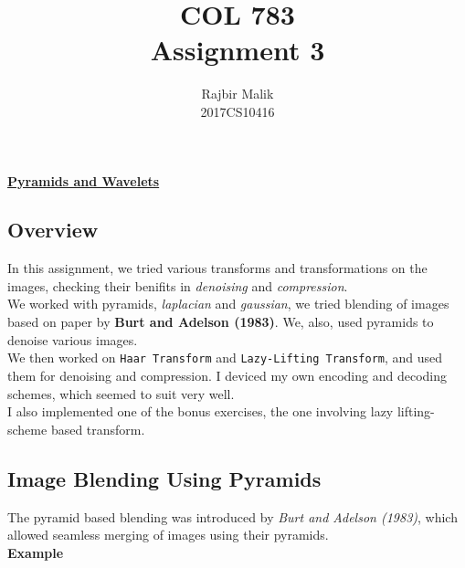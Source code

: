 \documentclass{article}
\title{COL 783 \\ Assignment 3}
\author{Rajbir Malik \\ 2017CS10416}
\begin{document}
    
    \maketitle

    \begin{center}
    \Large{\underline{\textbf{Pyramids and Wavelets}}}
    \end{center}
    \subsection*{Overview}
    In this assignment, we tried various transforms and transformations on the images, checking their benifits in \textit{denoising} and \textit{compression}.\\ 
    We worked with pyramids, \textit{laplacian} and \textit{gaussian}, we tried blending of images based on paper by \textbf{Burt and Adelson (1983)}. We, also, used pyramids to denoise various images.\\
    We then worked on \texttt{Haar Transform} and \texttt{Lazy-Lifting Transform}, and used them for denoising and compression. I deviced my own encoding and decoding schemes, which seemed to suit very well.\\
    I also implemented one of the bonus exercises, the one involving lazy lifting-scheme based transform.
    \pagebreak
    \subsection*{Image Blending Using Pyramids}
    The pyramid based blending was introduced by \textit{Burt and Adelson (1983)}, which allowed seamless merging of images using their pyramids.\\
    
    \textbf{Example}\\
\end{document}
